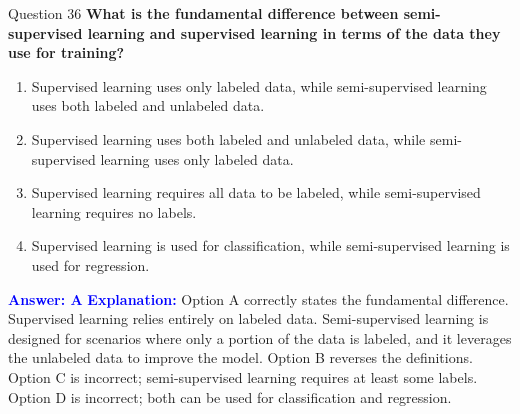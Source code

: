 \documentclass[8pt]{beamer}  %
\begin{document}
	\begin{frame}{Question 36}
		\textbf{What is the fundamental difference between semi-supervised learning and supervised learning in terms of the data they use for training?}
		\begin{enumerate}
			\item Supervised learning uses only labeled data, while semi-supervised learning uses both labeled and unlabeled data.
			\item Supervised learning uses both labeled and unlabeled data, while semi-supervised learning uses only labeled data.
			\item Supervised learning requires all data to be labeled, while semi-supervised learning requires no labels.
			\item Supervised learning is used for classification, while semi-supervised learning is used for regression.
		\end{enumerate}
		\vspace{0.2cm}
		\textcolor{blue}{\textbf{Answer: A}}
		\vspace{0.2cm}
		\textcolor{blue}{\textbf{Explanation:}} Option A correctly states the fundamental difference. Supervised learning relies entirely on labeled data. Semi-supervised learning is designed for scenarios where only a portion of the data is labeled, and it leverages the unlabeled data to improve the model. Option B reverses the definitions. Option C is incorrect; semi-supervised learning requires at least some labels. Option D is incorrect; both can be used for classification and regression.
	\end{frame}
	
\end{document}
